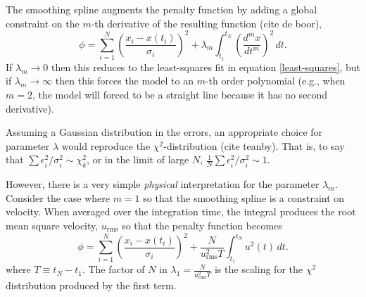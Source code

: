 \documentclass[twocol]{ametsoc}
\begin{document}
The smoothing spline augments the penalty function by adding a global constraint on the $m$-th derivative of the resulting function (cite de boor),
\begin{equation}
\label{smoothing-spline}
\phi =  \sum_{i=1}^{N} \left( \frac{x_i - x(t_i)}{\sigma_i} \right) ^2 + \lambda_m \int_{t_1}^{t_N} \left(\frac{d^m x}{dt^m}\right)^2 \, dt.
\end{equation}
If $\lambda_m \rightarrow 0$ then this reduces to the least-squares fit in equation \ref{least-squares}, but if $\lambda_m \rightarrow \infty$ then this forces the model to an $m$-th order polynomial (e.g., when $m=2$, the model will forced to be a straight line because it has no second derivative). 

Assuming a Gaussian distribution in the errors, an appropriate choice for parameter $\lambda$ would reproduce the $\chi^2$-distribution (cite teanby). That is, to say that $\sum \epsilon_i^2/\sigma_i^2 \sim \chi^2_k$, or in the limit of large $N$,  $\frac{1}{N} \sum \epsilon_i^2/\sigma_i^2 \sim 1$.

However, there is a very simple \emph{physical} interpretation for the parameter $\lambda_m$. Consider the case where $m=1$ so that the smoothing spline is a constraint on velocity. When averaged over the integration time, the integral produces the root mean square velocity, $u_{\textrm{rms}}$ so that the penalty function becomes
\begin{equation}
\label{smoothing-spline-velocity}
\phi =  \sum_{i=1}^{N} \left( \frac{x_i - x(t_i)}{\sigma_i} \right) ^2 + \frac{N}{u_{\textrm{rms}}^2 T} \int_{t_1}^{t_N} u^2(t) \, dt.
\end{equation}
where $T\equiv t_N-t_1$. The factor of $N$ in $\lambda_1 =  \frac{N}{u_{\textrm{rms}}^2 T}$ is the scaling for the $\chi^2$ distribution produced by the first term.
\end{document}
